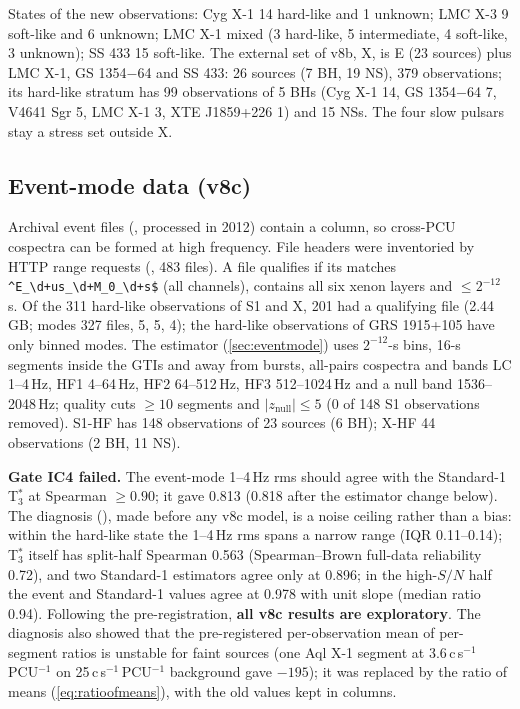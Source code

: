 States of the new observations: Cyg X-1 14 hard-like and 1 unknown; LMC X-3 9 soft-like and 6 unknown; LMC X-1 mixed
(3 hard-like, 5 intermediate, 4 soft-like, 3 unknown); SS 433 15 soft-like. The external set of v8b, X, is E (23 sources)
plus LMC X-1, GS 1354$-$64 and SS 433: 26 sources (7 BH, 19 NS), 379 observations; its hard-like stratum has 99 observations
of 5 BHs (Cyg X-1 14, GS 1354$-$64 7, V4641 Sgr 5, LMC X-1 3, XTE J1859+226 1) and 15 NSs. The four slow pulsars stay a
stress set outside X.

\subsection{Event-mode data (v8c)}
Archival event files (, processed in 2012) contain a  column, so cross-PCU cospectra can be
formed at high frequency. File headers were inventoried by HTTP range requests (, 483
files). A file qualifies if its  matches \verb|^E_\d+us_\d+M_0_\d+s$| (all channels),  contains
all six xenon layers and  $\le2^{-12}$\,s. Of the 311 hard-like observations of S1 and X, 201 had a qualifying
file (2.44\,GB; modes  327 files,  5,  5,
 4); the hard-like observations of GRS 1915+105 have only binned modes. The estimator
(\cref{sec:eventmode}) uses $2^{-12}$-s bins, 16-s segments inside the GTIs and away from bursts, all-pairs cospectra and
bands LC 1--4\,Hz, HF1 4--64\,Hz, HF2 64--512\,Hz, HF3 512--1024\,Hz and a null band 1536--2048\,Hz; quality cuts $\ge10$
segments and $|z_\mathrm{null}|\le5$ (0 of 148 S1 observations removed). S1-HF has 148 observations of 23 sources (6 BH);
X-HF 44 observations (2 BH, 11 NS).

\textbf{Gate IC4 failed.} The event-mode 1--4\,Hz rms should agree with the Standard-1 T$^*_3$ at Spearman $\ge0.90$; it gave
0.813 (0.818 after the estimator change below). The diagnosis (), made before any v8c
model, is a noise ceiling rather than a bias: within the hard-like state the 1--4\,Hz rms spans a narrow range (IQR
0.11--0.14); T$^*_3$ itself has split-half Spearman 0.563 (Spearman--Brown full-data reliability 0.72), and two Standard-1
estimators agree only at 0.896; in the high-$S/N$ half the event and Standard-1 values agree at 0.978 with unit slope (median
ratio 0.94). Following the pre-registration, \textbf{all v8c results are exploratory}. The diagnosis also showed that the
pre-registered per-observation mean of per-segment ratios is unstable for faint sources (one Aql X-1 segment at 3.6\,c\,s$^{-1}$
\,PCU$^{-1}$ on 25\,c\,s$^{-1}$\,PCU$^{-1}$ background gave $-195$); it was replaced by the ratio of means (\cref{eq:ratioofmeans}),
with the old values kept in  columns.

